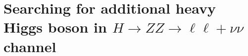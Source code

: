\chapter{Searching for additional heavy Higgs boson in $H\rightarrow ZZ \rightarrow \ell\ell+\nu\nu$ channel}
